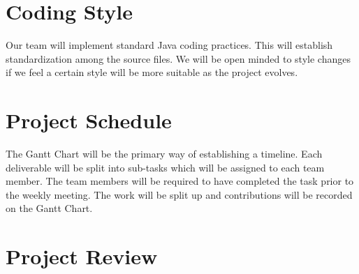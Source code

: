 \documentclass{article}
\begin{document}
\section{Coding Style}
Our team will implement standard Java coding practices. This will establish standardization among the source files. We will be open minded to style changes if we feel a certain style will be more suitable as the project evolves.

\section{Project Schedule}
The Gantt Chart will be the primary way of establishing a timeline. Each deliverable will be split into sub-tasks which will be assigned to each team member. The team members will be required to have completed the task prior to the weekly meeting. The work will be split up and contributions will be recorded on the Gantt Chart.




\section{Project Review}
\end{document}
